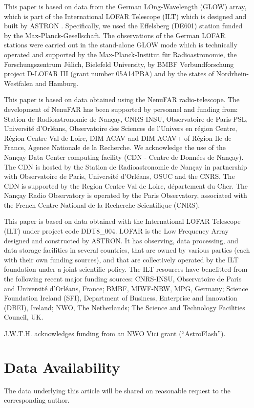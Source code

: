 This paper is based on data from the German LOng-Wavelength (GLOW) array, which is part of the International LOFAR Telescope (ILT) which is designed and built by ASTRON \citep{HWG+2013}. Specifically, we used the Effelsberg (DE601) station funded by the Max-Planck-Gesellschaft. The observations of the German LOFAR stations were carried out in the stand-alone GLOW mode which is technically operated and supported by the Max-Planck-Institut f\"ur Radioastronomie, the Forschungszentrum J\"ulich, Bielefeld University, by BMBF Verbundforschung project D-LOFAR III (grant number 05A14PBA) and by the states of Nordrhein-Westfalen and Hamburg.

This paper is based on data obtained using the NenuFAR radio-telescope. The development of NenuFAR has been supported by personnel and funding from: Station de Radioastronomie de Nan\c{c}ay, CNRS-INSU, Observatoire de Paris-PSL, Universit\'e d'Orl\'eans, Observatoire des Sciences de l'Univers en r\'egion Centre, R\'egion Centre-Val de Loire, DIM-ACAV and DIM-ACAV+ of R\'egion Ile de France, Agence Nationale de la Recherche. We acknowledge the use of the Nan\c{c}ay Data Center computing facility (CDN - Centre de Donn\'ees de Nan\c{c}ay). The CDN is hosted by the Station de Radioastronomie de Nan\c{c}ay in partnership with Observatoire de Paris, Universit\'e d'Orl\'eans, OSUC and the CNRS. The CDN is supported by the Region Centre Val de Loire, d\'epartement du Cher. The Nan\c{c}ay Radio Observatory is operated by the Paris Observatory, associated with the French Centre National de la Recherche Scientifique (CNRS).

This paper is based on data obtained with the International LOFAR Telescope (ILT) under project code DDT8\_004. LOFAR \citep{HWG+2013} is the Low Frequency Array designed and constructed by ASTRON. It has observing, data processing, and data storage facilities in several countries, that are owned by various parties (each with their own funding sources), and that are collectively operated by the ILT foundation under a joint scientific policy. The ILT resources have benefitted from the following recent major funding sources: CNRS-INSU, Observatoire de Paris and Universit\'{e} d'Orl\'{e}ans, France; BMBF, MIWF-NRW, MPG, Germany; Science Foundation Ireland (SFI), Department of Business, Enterprise and Innovation (DBEI), Ireland; NWO, The Netherlands; The Science and Technology Facilities Council, UK.

J.W.T.H. acknowledges funding from an NWO Vici grant (``AstroFlash'').

\section*{Data Availability}
The data underlying this article will be shared on reasonable request to the corresponding author.









